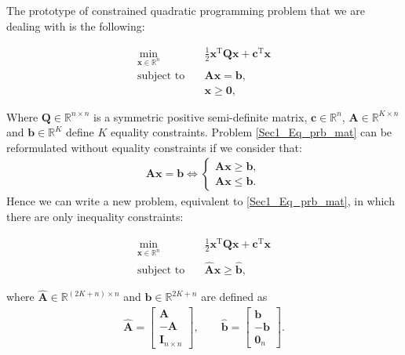 The prototype of constrained quadratic programming problem that we are dealing with is the following:
\begin{linenomath}

	\begin{align} 
		\min_{\bm{x}\in \mathbb{R}^{n}} \quad  &\frac{1}{2}\bm{x}^\mathrm{T}\mathbf{Q}\bm{x} + \bm{c}^{\mathrm{T}}\bm{x} \label{Sec1_Eq_prb_mat} \\
		\text{subject to}\quad & \mathbf{A}\bm{x} = \bm{b}, \nonumber\\
		& \bm{x} \geq \bm{0},\nonumber
	\end{align}  
\end{linenomath}
Where \(\mathbf{Q}\in \mathbb{R}^{n \times n}\) is a symmetric positive semi-definite matrix, \(\bm{c}\in \mathbb{R}^n\), \(\mathbf{A}\in \mathbb{R}^{K \times n}\) and \(\bm{b} \in \mathbb{R}^K\) define \(K\) equality constraints. Problem \ref{Sec1_Eq_prb_mat} can be reformulated without equality constraints if we consider that:
\begin{align}
  \mathbf{A}\bm{x} = \bm{b} \iff \begin{cases}
      \mathbf{A}\bm{x} \geq \bm{b},\\
      \mathbf{A}\bm{x} \leq \bm{b}.
  \end{cases}
\end{align}
Hence we can write a new problem, equivalent to \ref{Sec1_Eq_prb_mat}, in which there are only inequality constraints:
\begin{linenomath}
	\begin{align}
		\min_{\bm{x}\in \mathbb{R}^{n}} \quad  &\frac{1}{2}\bm{x}^\mathrm{T}\mathbf{Q}\bm{x} + \bm{c}^{\mathrm{T}}\bm{x} \label{Sec2_Eq_yolo} \\
		\text{subject to}\quad & \hat{\mathbf{A}}\bm{x} \geq \hat{\bm{b}}, \nonumber
	\end{align}
\end{linenomath}
%
where $\hat{\mathbf{A}}\in \mathbb{R}^{(2K + n)\times n}$ and $\hat{\bm{b}}\in \mathbb{R}^{2K + n}$ are defined as
\begin{align}
	\hat{\mathbf{A}} = \begin{bmatrix}
	    \mathbf{A} \\
	    -\mathbf{A}\\
	    \mathbf{I}_{n\times n}
	\end{bmatrix}, \quad \quad  
	\hat{\bm{b}} = \begin{bmatrix}
	    \bm{b} \\
	    -\bm{b}\\
	    \bm{0}_{n}
	\end{bmatrix}.
	\label{Sec2_Eq_A_hat_B_hat}
\end{align}
